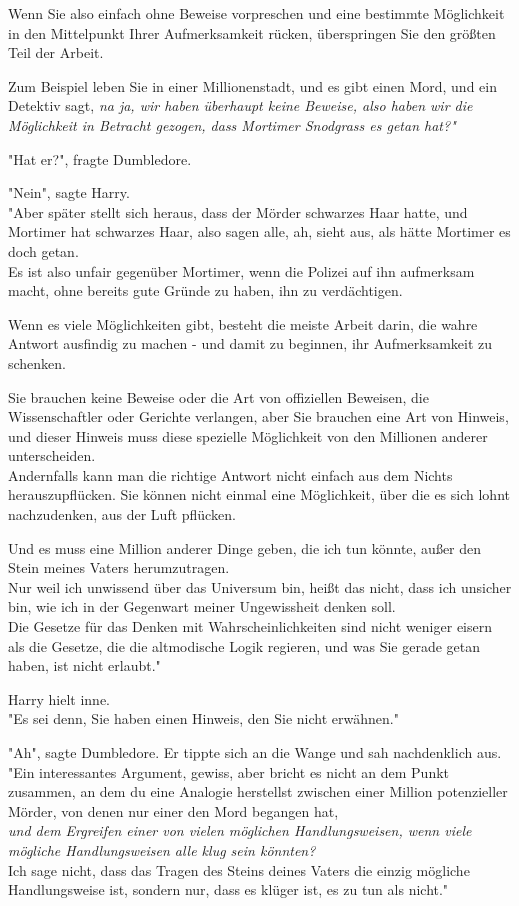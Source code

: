 {Wenn Sie also einfach ohne Beweise vorpreschen und eine bestimmte Möglichkeit in den Mittelpunkt Ihrer Aufmerksamkeit rücken, überspringen Sie den größten Teil der Arbeit.

Zum Beispiel leben Sie in einer Millionenstadt, und es gibt einen Mord, und ein Detektiv sagt, \emph{na ja, wir haben überhaupt keine Beweise, also haben wir die Möglichkeit in Betracht gezogen, dass Mortimer Snodgrass es getan hat?"}

"Hat er?", fragte Dumbledore.

"Nein", sagte Harry.\\ "Aber später stellt sich heraus, dass der Mörder schwarzes Haar hatte, und Mortimer hat schwarzes Haar, also sagen alle, ah, sieht aus, als hätte Mortimer es doch getan.\\ Es ist also unfair gegenüber Mortimer, wenn die Polizei auf ihn aufmerksam macht, ohne bereits gute Gründe zu haben, ihn zu verdächtigen.

Wenn es viele Möglichkeiten gibt, besteht die meiste Arbeit darin, die wahre Antwort ausfindig zu machen - und damit zu beginnen, ihr Aufmerksamkeit zu schenken.

Sie brauchen keine Beweise oder die Art von offiziellen Beweisen, die Wissenschaftler oder Gerichte verlangen, aber Sie brauchen eine Art von Hinweis, und dieser Hinweis muss diese spezielle Möglichkeit von den Millionen anderer unterscheiden.\\ Andernfalls kann man die richtige Antwort nicht einfach aus dem Nichts herauszupflücken. Sie können nicht einmal eine Möglichkeit, über die es sich lohnt nachzudenken, aus der Luft pflücken.

Und es muss eine Million anderer Dinge geben, die ich tun könnte, außer den Stein meines Vaters herumzutragen.\\ Nur weil ich unwissend über das Universum bin, heißt das nicht, dass ich unsicher bin, wie ich in der Gegenwart meiner Ungewissheit denken soll.\\ Die Gesetze für das Denken mit Wahrscheinlichkeiten sind nicht weniger eisern als die Gesetze, die die altmodische Logik regieren, und was Sie gerade getan haben, ist nicht erlaubt."

Harry hielt inne.\\ "Es sei denn, Sie haben einen Hinweis, den Sie nicht erwähnen."

"Ah", sagte Dumbledore. Er tippte sich an die Wange und sah nachdenklich aus.\\ "Ein interessantes Argument, gewiss, aber bricht es nicht an dem Punkt zusammen, an dem du eine Analogie herstellst zwischen einer Million potenzieller Mörder, von denen nur einer den Mord begangen hat,\\ \emph{und dem Ergreifen einer von vielen möglichen Handlungsweisen, wenn viele mögliche Handlungsweisen alle klug sein könnten?}\\ Ich sage nicht, dass das Tragen des Steins deines Vaters die einzig mögliche Handlungsweise ist, sondern nur, dass es klüger ist, es zu tun als nicht."

}
